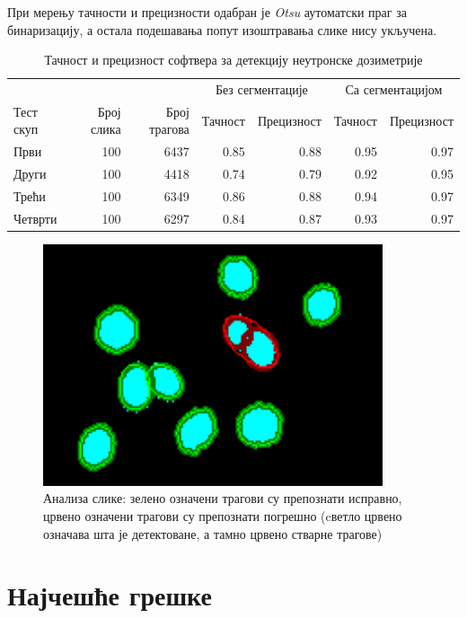 \documentclass[12pt,a4paper,serbian,oneside]{book}
\begin{document}
При мерењу тачности и прецизности одабран је \textit{Otsu} аутоматски праг за бинаризацију, а остала подешавања попут изоштравања слике нису укључена.

\begin{table}[H]
\centering%
\caption{Тачност и прецизност софтвера за детекцију неутронске дозиметрије}
\begin{tabular}{lrrrrrr}
\hline
& & & \multicolumn{2}{c}{Без сегментације} & \multicolumn{2}{c}{Са сегментацијом} \\
Тест скуп & Број слика & Број трагова & Тачност & Прецизност & Тачност &  Прецизност \\
\hline
Први & 100 & 6437 & 0.85 & 0.88 & 0.95 & 0.97 \\
Други & 100 & 4418 & 0.74 & 0.79 & 0.92 & 0.95 \\
Трећи & 100 & 6349 & 0.86 & 0.88 & 0.94 & 0.97 \\
Четврти & 100 & 6297 & 0.84 & 0.87 & 0.93 & 0.97 \\
\hline
\end{tabular}
\label{tab:metrics}
\end{table} 

\begin{figure}[H]
\begin{center}
\includegraphics[width=100mm]{images/analysis.png}
\end{center}
\caption{Анализа слике: зелено означени трагови су препознати исправно, црвено означени трагови су препознати погрешно (cветло црвено означава шта је детектоване, а тамно црвено стварне трагове) }
\label{fig:analysis}
\end{figure}

\section{Најчешће грешке}
\end{document}
